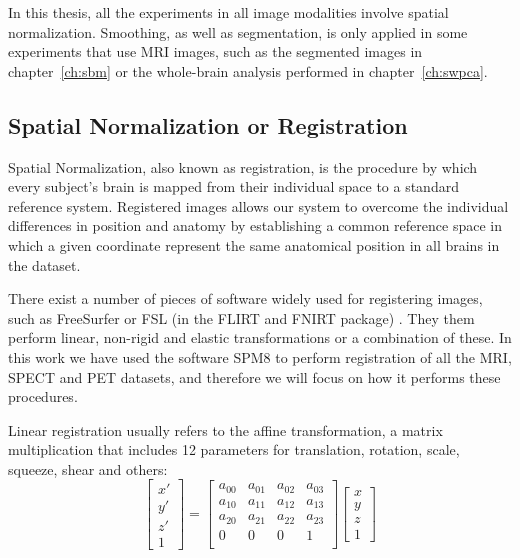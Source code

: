 In this thesis, all the experiments in all image modalities involve spatial normalization. Smoothing, as well as segmentation, is only applied in some experiments that use \ac{MRI} images, such as the segmented images in chapter~\ref{ch:sbm} or the whole-brain analysis performed in chapter~\ref{ch:swpca}. 

\subsection{Spatial Normalization or Registration}
Spatial Normalization, also known as registration, is the procedure by which every subject's brain is mapped from their individual space to a standard reference system. Registered images allows our system to overcome the individual differences in position and anatomy by establishing a common reference space in which a given coordinate represent the same anatomical position in all brains in the dataset. 

There exist a number of pieces of software widely used for registering images, such as FreeSurfer \cite{Reuter2010} or FSL (in the FLIRT and FNIRT package) \cite{Smith2004}. They them perform linear, non-rigid and elastic transformations or a combination of these. In this work we have used the software \ac{SPM8} \cite{spm_book} to perform registration of all the \ac{MRI}, \ac{SPECT} and \ac{PET} datasets, and therefore we will focus on how it performs these procedures.

Linear registration usually refers to the affine transformation, a matrix multiplication that includes 12 parameters for translation, rotation, scale, squeeze, shear and others: 
\begin{equation}\label{eq:affine}
	\left[\begin{matrix}
	x'\\y'\\z'\\1
	\end{matrix}\right]
	 = \left[\begin{matrix}
	 a_{00} & a_{01} & a_{02} & a_{03}\\
	 a_{10} & a_{11} & a_{12} & a_{13}\\
	 a_{20} & a_{21} & a_{22} & a_{23}\\
	 0 & 0 & 0 & 1\\
	 \end{matrix}\right]
	 \left[\begin{matrix}
	 x\\y\\z\\1
	 \end{matrix}\right]
\end{equation}

